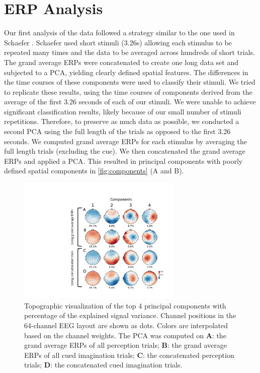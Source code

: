 \chapter{ERP Analysis}
Our first analysis of the data followed a strategy similar to the one used in Schaefer \etal \citeyear{schaefer_name_2011}.
Schaefer \etal \citeyear{schaefer_name_2011} used short stimuli (3.26s) allowing each stimulus to be repeated many times and the data to be averaged across hundreds of short trials. 
The grand average \acp{ERP} were concatenated to create one long data set and subjected to a \ac{PCA}, yielding clearly defined spatial features. 
The differences in the time courses of these components were used to classify their stimuli. 
We tried to replicate these results, using the time courses of components derived from the average of the first 3.26 seconds of each of our stimuli. 
We were unable to achieve significant classification results, likely because of our small number of stimuli repetitions.
Therefore, to preserve as much data as possible, we conducted a second \ac{PCA} using the full length of the trials as opposed to the first 3.26 seconds. 
We computed grand average \acp{ERP} for each stimulus by averaging the full length trials (excluding the cue).
We then concatenated the grand average \acp{ERP} and applied a \ac{PCA}. 
This resulted in principal components with poorly defined spatial components in \autoref{fig:components} (A and B).
\begin{figure}[htb]	%
  \centerline{\includegraphics[width=0.7\textwidth]{Figures/principal_components_labels.pdf}}
  \caption{Topographic visualization of the top 4 principal components with percentage of the explained signal variance. Channel positions in the 64-channel EEG layout are shown as dots. Colors are interpolated based on the channel weights. The PCA was computed on {\bf A}: the grand average \acp{ERP} of all perception trials; {\bf B}: the grand average \acp{ERP} of all cued imagination trials; {\bf C}: the concatenated perception trials; {\bf D}: the concatenated cued imagination trials.}
  \label{fig:components}
\end{figure}

